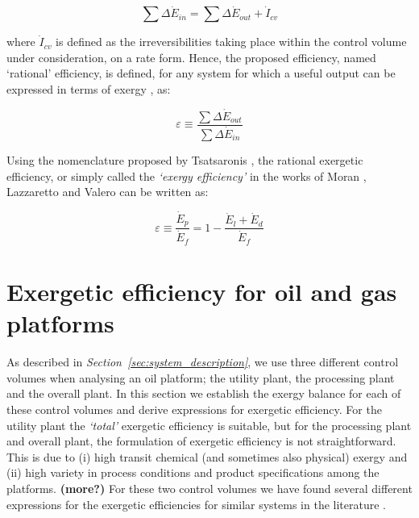 \begin{equation}
	\sum \Delta \dot{E}_{in}=\sum \Delta \dot{E}_{out}+\dot{I}_{cv}
\end{equation} 
 
	where $\dot{I}_{cv}$ is defined as the irreversibilities taking place within the control volume under consideration, on a rate form. Hence, the proposed efficiency, named `rational' efficiency, is defined, for any system for which a useful output can be expressed in terms of exergy \cite{Kotas1980a,BejanAdrian;TsatsaronisGeorge;Moran1996}, as: 
 
 \begin{equation}
	\varepsilon \equiv \frac{\sum \Delta \dot{E}_{out}}{\sum \Delta \dot{E}_{in}}
\end{equation}
 
Using the nomenclature proposed by Tsatsaronis \cite{Tsatsaronis2007}, the rational exergetic efficiency, or simply called the \emph{`exergy efficiency'} in the works of Moran \cite{Moran1989,Moran2007}, Lazzaretto \cite{Lazzaretto1999,Lazzaretto2006} and Valero \cite{Valero1987} can be written as:

\begin{equation}
	\varepsilon \equiv \frac{\dot{E}_p}{\dot{E}_f} = 1-\frac{\dot{E}_l+\dot{E}_d}{\dot{E}_f}
\end{equation} 

 
 \section{Exergetic efficiency for oil and gas platforms}
 \label{sec:efficiency}
 
As described in \emph{Section~\ref{sec:system_description}}, we use three different control volumes when analysing an oil platform; the utility plant, the processing plant and the overall plant. In this section we establish the exergy balance for each of these control volumes and derive expressions for exergetic efficiency. For the utility plant the \emph{`total'} exergetic efficiency is suitable, but for the processing plant and overall plant, the formulation of exergetic efficiency is not straightforward. This is due to (i) high transit chemical (and sometimes also physical) exergy and (ii) high variety in process conditions and product specifications among the platforms. \textbf{(more?)} For these two control volumes we have found several different expressions for the exergetic efficiencies for similar systems in the literature \cite{Oliveira1997,Cornelissen1997,Voldsund2010,Voldsund2012,Voldsund2013,Rian2012,Thermoeconomics2001}. 

